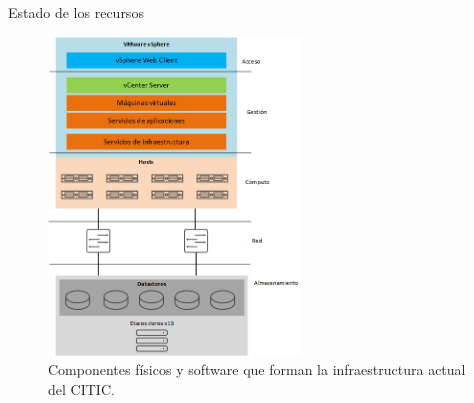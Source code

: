 \begin{chapter}{Estado de los recursos}
\begin{figure}[hp]
    \centering
    \includegraphics[width=0.6\textwidth]{imaxes/cap2recursos/recursosReal.png}
    \caption{Componentes físicos y software que forman la infraestructura actual del CITIC.}
    \label{fig:infrastructure-components-production}
\end{figure}
\FloatBarrier



\end{chapter}
